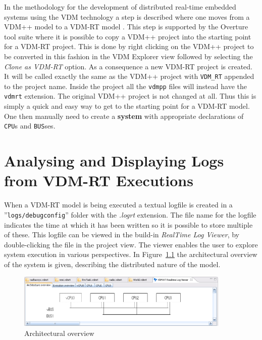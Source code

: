 \documentclass{overturerepchap}
\begin{document}
In the methodology for the development of distributed real-time
embedded systems using the VDM technology a step is described where one
moves from a VDM++ model to a VDM-RT model \cite{Larsen&09b}. This
step is supported by the Overture tool suite where it is possible to
copy a VDM++ project into the starting point for a VDM-RT
project. This is done by right clicking on the VDM++ project to be
converted in this fashion in the VDM Explorer view followed by 
selecting the \emph{Clone as VDM-RT} option. As a consequence a new VDM-RT project is
created. It will be called exactly the
same as the VDM++ project with \texttt{VDM\_RT} appended to the project
name. Inside the project all the \texttt{vdmpp} files will instead
have the \texttt{vdmrt} extension. The original VDM++ project is not
changed at all. Thus this is simply a quick and easy way to get to the
starting point for a VDM-RT model. One then manually need to
create a {\bf\ttfamily system} with appropriate declarations of
\texttt{CPU}s and \texttt{BUS}ses.
 
\chapter{Analysing and Displaying Logs from VDM-RT Executions}\label{sec:showlog}

When a VDM-RT model is being executed a textual logfile is created in
a ''\texttt{logs/debugconfig}'' folder with the \emph{.logrt} extension. The
file name for the logfile indicates the time at which it has been
written so it is possible to store multiple of these. This logfile can be
viewed in the build-in \emph{RealTime Log Viewer},
by double-clicking the file in the project view. The viewer enables
the user to explore system execution in various perspectives. In
Figure~\ref{fig:userguide:ArchitecturalOverview} the architectural
overview of the system is given, describing the distributed nature of
the model.

\begin{figure}[htp]
\begin{center}
  \includegraphics[width=4in]{figures/ArchitectureOverview}
  \caption{Architectural overview}
  \label{fig:userguide:ArchitecturalOverview}
\end{center}
\end{figure}
\end{document}
